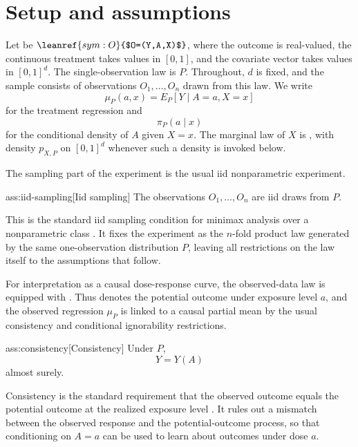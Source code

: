 \section{Setup and assumptions}

Let  be
\(\leanref{sym:O}{$O=(Y,A,X)$}\), where the outcome is real-valued, the continuous treatment  takes values in \([0,1]\), and the covariate vector  takes values in \([0,1]^d\). The single-observation law is $P$. Throughout, \(d\) is fixed, and the sample consists of observations \(O_1,\ldots,O_n\) drawn from this law. We write
\[
\mu_P(a,x)=E_P[Y\mid A=a,X=x]
\]
for the treatment regression and
\[
\pi_P(a\mid x)
\]
for the conditional density of \(A\) given \(X=x\). The marginal law of \(X\) is , with density \(p_{X,P}\) on \([0,1]^d\) whenever such a density is invoked below.

The sampling part of the experiment is the usual iid nonparametric experiment.

\begin{assumptionv}{ass:iid-sampling}[Iid sampling]
The observations \(O_1,\ldots,O_n\) are iid draws from \(P\).
\end{assumptionv}

This is the standard iid sampling condition for minimax analysis over a nonparametric class \citep{tsybakov2009}. It fixes the experiment as the \(n\)-fold product law generated by the same one-observation distribution \(P\), leaving all restrictions on the law itself to the assumptions that follow.

For interpretation as a causal dose-response curve, the observed-data law is equipped with . Thus  denotes the potential outcome under exposure level \(a\), and the observed regression \(\mu_P\) is linked to a causal partial mean by the usual consistency and conditional ignorability restrictions.

\begin{assumptionv}{ass:consistency}[Consistency]
Under \(P\),
\[
Y=Y(A)
\]
almost surely.
\end{assumptionv}

Consistency is the standard requirement that the observed outcome equals the potential outcome at the realized exposure level \citep{kennedy2017}. It rules out a mismatch between the observed response and the potential-outcome process, so that conditioning on \(A=a\) can be used to learn about outcomes under dose \(a\).

